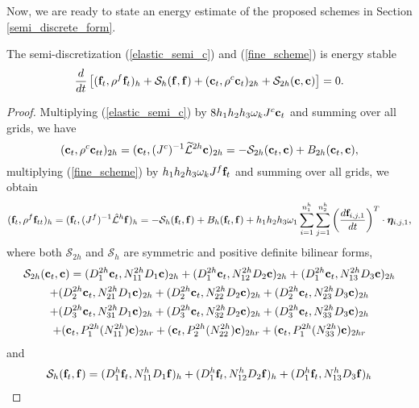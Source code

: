 Now, we are ready to state an energy estimate of the proposed schemes in Section \ref{semi_discrete_form}. 
 \begin{theorem}\label{thm1}
  The semi-discretization (\ref{elastic_semi_c}) and (\ref{fine_scheme}) is energy stable 
  \[
  \frac{d}{dt}\left[({\bf f}_t,\rho^f {\bf f}_t)_{h} + \mathcal{S}_{h}({\bf f},{\bf f}) + ({\bf c}_t,\rho^{c} {\bf c}_t)_{2h} + \mathcal{S}_{2h}({\bf c},{\bf c}) \right]   = 0.
  \]
 \end{theorem}
 \begin{proof}
 Multiplying (\ref{elastic_semi_c}) by $8h_1h_2h_3\omega_kJ^{c}{\bf c}_t$ and summing over all grids, we have
\begin{equation*}\label{coarse_simple}
({\bf c}_t, {\rho}^{c}{\bf c}_{tt})_{2h} = ({\bf c}_t,({J^c})^{-1}\wt{\mathcal{L}}^{2h}{\bf c})_{2h} = -\mathcal{S}_{2h}({\bf c}_t,{\bf c}) + B_{2h}({\bf c}_t,{{\bf c}}),
\end{equation*}
multiplying (\ref{fine_scheme}) by $h_1h_2h_3\omega_kJ^f{\bf f}_t$ and summing over all grids, we obtain
\begin{equation*}
({\bf f}_t, {\rho}^f{\bf f}_{tt})_h = ({\bf f}_t,({J^f})^{-1}\hat{\mathcal{L}}^h{\bf f})_h = -\mathcal{S}_{h}({\bf f}_t,{\bf f}) + B_h({\bf f}_t,{\bf f}) 
+h_1h_2h_3\omega_1\sum_{i = 1}^{n_1^h}\sum_{j=1}^{n_2^h} \left(\frac{d{\bf f}_{i,j,1}}{dt}\right)^T\cdot{\bm \eta}_{i,j,1},
\end{equation*}
where  both $\mathcal{S}_{2h}$ and $\mathcal{S}_{h}$ are symmetric and positive definite bilinear forms, 
\begin{multline*}
\mathcal{S}_{2h}({\bf c}_t,{\bf c}) = ({D}_1^{2h}{\bf c}_t,{N}_{11}^{2h}{D}_1{\bf c})_{2h} +  ({D}_1^{2h}{\bf c}_t,{N}_{12}^{2h}{D}_2{\bf c})_{2h} +  ({D}_1^{2h}{\bf c}_t,{N}_{13}^{2h}{D}_3{\bf c})_{2h}\\
 +  ({D}_2^{2h}{\bf c}_t,{N}_{21}^{2h}{D}_1{\bf c})_{2h} 
+  ({D}_2^{2h}{\bf c}_t,{N}_{22}^{2h}{D}_2{\bf c})_{2h} +  ({D}_2^{2h}{\bf c}_t,{N}_{23}^{2h}{D}_3{\bf c})_{2h} \\
+  ({D}_3^{2h}{\bf c}_t,{N}_{31}^{2h}{D}_1{\bf c})_{2h} 
+  ({D}_3^{2h}{\bf c}_t,{N}_{32}^{2h}{D}_2{\bf c})_{2h} +  ({D}_3^{2h}{\bf c}_t,{N}_{33}^{2h}{D}_3{\bf c})_{2h}\\
+ ({\bf c}_t, P^{2h}_1(N_{11}^{2h}){\bf c})_{2hr} + ({\bf c}_t, P^{2h}_2(N_{22}^{2h}){\bf c})_{2hr} + ({\bf c}_t, P^{2h}_1(N_{33}^{2h}){\bf c})_{2hr}
\end{multline*}
and 
\begin{multline*}
\mathcal{S}_{h}({\bf f}_t,{\bf f}) = ({D}_1^{h}{\bf f}_t,{N}_{11}^{h}{D}_1{\bf f})_{h} +  ({D}_1^{h}{\bf f}_t,{N}_{12}^{h}{D}_2{\bf f})_{h} +  ({D}_1^{h}{\bf f}_t,{N}_{13}^{h}{D}_3{\bf f})_{h}\\

\end{multline*}
\end{proof}
